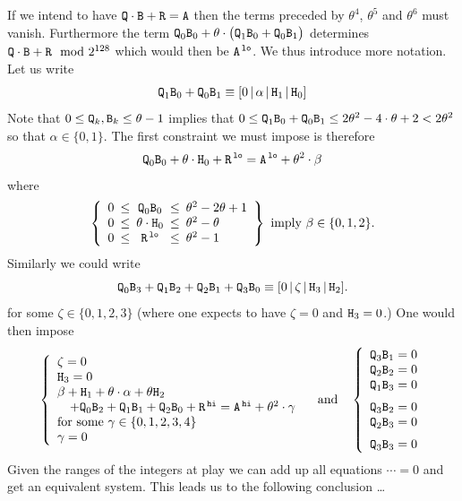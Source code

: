 If we intend to have $\texttt{Q} \cdot \texttt{B} + \texttt{R} = \texttt{A}$ then the terms preceded by $\theta^{4}$, $\theta^{5}$ and $\theta^{6}$ must vanish. Furthermore the term
$\texttt{Q}_{0}\texttt{B}_{0}
+ \theta\cdot
\big(
\texttt{Q}_{1}\texttt{B}_{0}
+ \texttt{Q}_{0}\texttt{B}_{1}
\big)$ determines $\texttt{Q} \cdot \texttt{B} + \texttt{R} \mod 2^{128}$ which would then be $\texttt{A}^{\mathtt{\,lo}}$.
We thus introduce more notation. Let us write
\[
	\texttt{Q}_{1}\texttt{B}_{0}
	+
	\texttt{Q}_{0}\texttt{B}_{1}
	\equiv
	[0
	\,|\, \alpha
	\,|\, \texttt{H}_{1}
	\,|\, \texttt{H}_{0}
	]
\]
Note that $0 \leq \texttt{Q}_{k},\texttt{B}_{k} \leq \theta - 1$ implies that $0 \leq \texttt{Q}_{1}\texttt{B}_{0} + \texttt{Q}_{0}\texttt{B}_{1} \leq 2 \theta^2 - 4\cdot\theta + 2 < 2 \theta^2$ so that $\alpha\in\{0,1\}$. The first constraint we must impose is therefore
\[
	\texttt{Q}_{0}\texttt{B}_{0}
	+
	\theta \cdot \texttt{H}_{0}
	+
	\texttt{R}^{\mathtt{\,lo}}
	=
	\texttt{A}^{\mathtt{\,lo}} + \theta^2 \cdot \beta
\]
where
\[
	\left\{
	\begin{array}{ccccl}
		0 & \!\!\! \leq \!\!\! & \col{Q}_{0}\col{B}_{0} & \!\!\! \leq \!\!\! & \theta^2 - 2\theta + 1 \\
		0 & \!\!\! \leq \!\!\! & \theta \cdot \col{H}_{0} & \!\!\! \leq \!\!\! & \theta^2 - \theta \\
		0 & \!\!\! \leq \!\!\! & \col{R}\low & \!\!\! \leq \!\!\! & \theta^2 - 1 \\
	\end{array}
	\right\}
	\text{ imply }
	\beta\in\{0,1,2\}.
\]
Similarly we could write
\[
	\texttt{Q}_{0}\texttt{B}_{3}
	+
	\texttt{Q}_{1}\texttt{B}_{2}
	+
	\texttt{Q}_{2}\texttt{B}_{1}
	+
	\texttt{Q}_{3}\texttt{B}_{0}
	\equiv
	[0 \,|\,
	\zeta \,|\,
	\texttt{H}_{3} \,|\,
	\texttt{H}_{2} ].
\]
for some $\zeta\in\{0, 1, 2, 3\}$ (where one expects to have $\zeta = 0$ and $\texttt{H}_{3} = 0$.) One would then impose
\[
	\left\{\begin{array}{l}
	\zeta = 0 \\
	\col{H}_{3} = 0 \\
	\beta + \col{H}_{1} + \theta \cdot \alpha + \theta\col{H}_{2} \\
	\quad + 
	\col{Q}_{0}\col{B}_{2}
	+
	\col{Q}_{1}\col{B}_{1}
	+
	\col{Q}_{2}\col{B}_{0} + \col{R}\high = \col{A}\high
	+ \theta^2 \cdot \gamma \\
	\text{for some }\gamma\in\{0,1,2,3,4\} \\
	\gamma = 0 \\
	\end{array}
	\right.
	\quad\text{and}\quad
	\left\{
	\begin{array}{l}
	\col{Q}_{3}\col{B}_{1} = 0 \\
	\col{Q}_{2}\col{B}_{2} = 0 \\
	\col{Q}_{1}\col{B}_{3} = 0 \vspace{2mm} \\
	\col{Q}_{3}\col{B}_{2} = 0 \\
	\col{Q}_{2}\col{B}_{3} = 0 \vspace{2mm} \\
	\col{Q}_{3}\col{B}_{3} = 0 \\
	\end{array}
	\right.
\]
Given the ranges of the integers at play we can add up all equations $\cdots = 0$ and get an equivalent system. This leads us to the following conclusion \dots{} %
